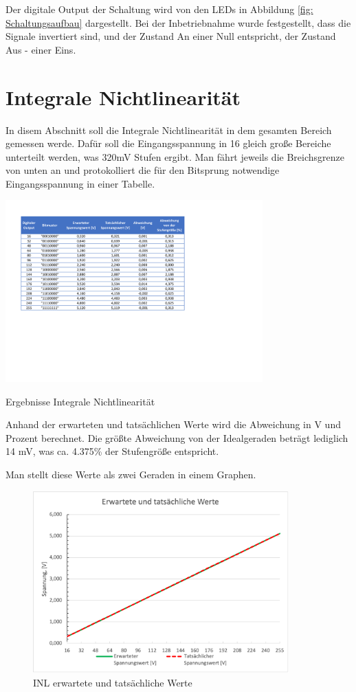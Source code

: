 Der digitale Output der Schaltung wird von den \acs{LED}s in Abbildung 
\ref{fig: Schaltungsaufbau} dargestellt.
Bei der Inbetriebnahme wurde festgestellt, dass die Signale invertiert sind, 
und der Zustand An einer Null entspricht, der Zustand Aus - einer Eins.

\section{Integrale Nichtlinearität}

In disem Abschnitt soll die Integrale Nichtlinearität in dem gesamten Bereich gemessen
werde. Dafür soll die Eingangsspannung in 16 gleich große Bereiche unterteilt werden, was 
320mV Stufen ergibt. Man fährt jeweils die Breichsgrenze von unten an und protokolliert 
die für den Bitsprung notwendige Eingangsspannung in einer Tabelle.


\begin{table}[H]
	\centering
	\includegraphics[height=7cm]{images/Versuch1d.pdf} 
	\caption[]{Ergebnisse Integrale Nichtlinearität}
	\label{fig: Ergebnisse Integrale Nichtlinearität}
\end{table}

Anhand der erwarteten und tatsächlichen Werte wird die Abweichung in V und Prozent
berechnet. Die größte Abweichung von der Idealgeraden beträgt lediglich 14 mV, 
was ca. 4.375\% der Stufengröße entspricht. \par

Man stellt diese Werte als zwei Geraden in einem Graphen.

\begin{figure}[H]
	\centering
	\includegraphics[height=7cm]{images/INL_gerade.png} 
	\caption[]{INL erwartete und tatsächliche Werte}
	\label{fig: INL erwartete und tatsächliche Werte}
\end{figure}

